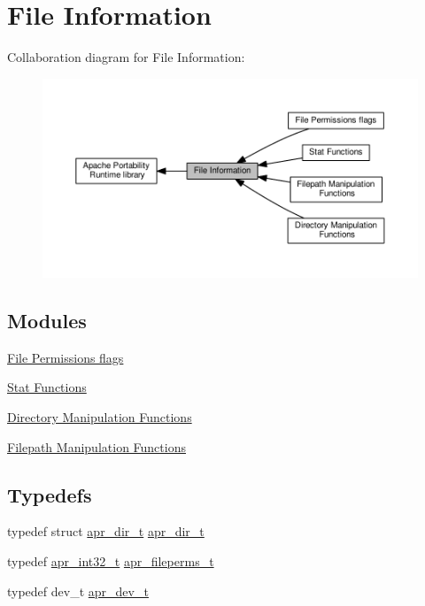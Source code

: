 \hypertarget{group__apr__file__info}{}\section{File Information}
\label{group__apr__file__info}
Collaboration diagram for File Information\+:
\nopagebreak
\begin{figure}[H]
\begin{center}
\leavevmode
\includegraphics[width=350pt]{group__apr__file__info}
\end{center}
\end{figure}
\subsection*{Modules}
\begin{DoxyCompactItemize}
\item 
\hyperlink{group__apr__file__permissions}{File Permissions flags}
\item 
\hyperlink{group__apr__file__stat}{Stat Functions}
\item 
\hyperlink{group__apr__dir}{Directory Manipulation Functions}
\item 
\hyperlink{group__apr__filepath}{Filepath Manipulation Functions}
\end{DoxyCompactItemize}
\subsection*{Typedefs}
\begin{DoxyCompactItemize}
\item 
typedef struct \hyperlink{structapr__dir__t}{apr\+\_\+dir\+\_\+t} \hyperlink{group__apr__file__info_ga92ed8cf52cba2abb42cf74087aa74da8}{apr\+\_\+dir\+\_\+t}
\item 
typedef \hyperlink{group__apr__platform_ga21ef1e35fd3ff9be386f3cb20164ff02}{apr\+\_\+int32\+\_\+t} \hyperlink{group__apr__file__info_ga3af19c4c47007169064a70f9351bc7d8}{apr\+\_\+fileperms\+\_\+t}
\item 
typedef dev\+\_\+t \hyperlink{group__apr__file__info_gae2c25c4b679613081599f776efa96c4a}{apr\+\_\+dev\+\_\+t}
\end{DoxyCompactItemize}
